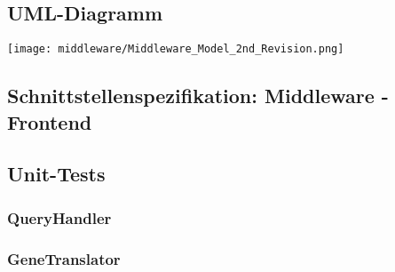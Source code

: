 \documentclass{scrartcl}
\begin{document}
\subsection{UML-Diagramm}
\texttt{[image: middleware/Middleware\_Model\_2nd\_Revision.png]}
\subsection{Schnittstellenspezifikation: Middleware - Frontend}
\subsection{Unit-Tests}
\subsubsection{QueryHandler}
\subsubsection{GeneTranslator}
\newpage
\end{document}
